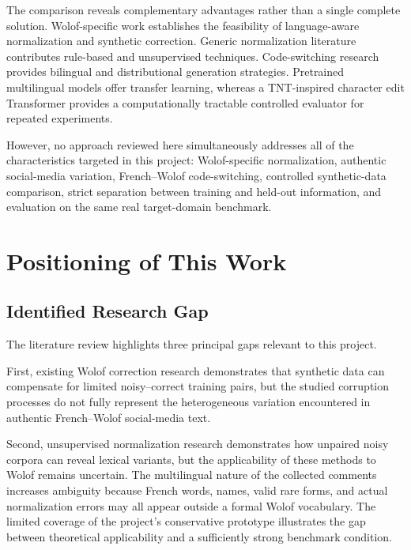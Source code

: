 \documentclass[12pt, a4paper, twoside, openany]{report}
\begin{document}
The comparison reveals complementary advantages rather than a single complete solution. Wolof-specific work establishes the feasibility of language-aware normalization and synthetic correction. Generic normalization literature contributes rule-based and unsupervised techniques. Code-switching research provides bilingual and distributional generation strategies. Pretrained multilingual models offer transfer learning, whereas a TNT-inspired character edit Transformer provides a computationally tractable controlled evaluator for repeated experiments.

However, no approach reviewed here simultaneously addresses all of the characteristics targeted in this project: Wolof-specific normalization, authentic social-media variation, French--Wolof code-switching, controlled synthetic-data comparison, strict separation between training and held-out information, and evaluation on the same real target-domain benchmark.


\section{Positioning of This Work}

\subsection{Identified Research Gap}

The literature review highlights three principal gaps relevant to this project.

First, existing Wolof correction research demonstrates that synthetic data can compensate for limited noisy--correct training pairs, but the studied corruption processes do not fully represent the heterogeneous variation encountered in authentic French--Wolof social-media text.

Second, unsupervised normalization research demonstrates how unpaired noisy corpora can reveal lexical variants, but the applicability of these methods to Wolof remains uncertain. The multilingual nature of the collected comments increases ambiguity because French words, names, valid rare forms, and actual normalization errors may all appear outside a formal Wolof vocabulary. The limited coverage of the project's conservative prototype illustrates the gap between theoretical applicability and a sufficiently strong benchmark condition.
\end{document}
